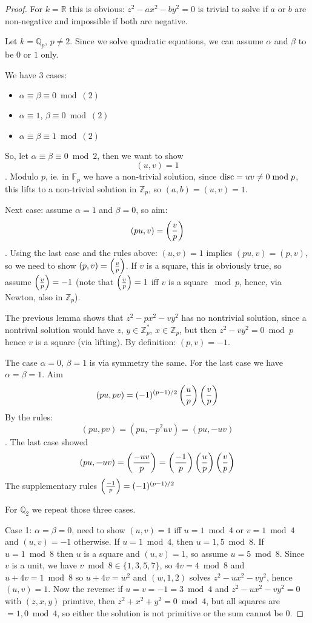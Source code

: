 \begin{proof}
  For $k=\mathbb R$ this is obvious: $z^2-ax^2-by^2 = 0$ is trivial to solve if
  $a$ or $b$ are non-negative and impossible if both are
  negative.


  Let $k=\mathbb Q_p$, $p\ne 2$. Since we solve quadratic equations, 
  we can assume $\alpha$ and $\beta$ to be $0$ or $1$ only.

  We have 3 cases:
  \begin{itemize}
    \item $\alpha \equiv \beta \equiv 0 \bmod (2)$
    \item $\alpha \equiv 1$, $\beta \equiv 0 \bmod (2)$
    \item $\alpha \equiv \beta \equiv 1 \bmod (2)$
  \end{itemize}

  So, let $\alpha \equiv \beta \equiv 0 \bmod 2$, then we want to show
  $$(u,v) = 1$$. Modulo $p$, ie. in $\mathbb F_p$ we have a non-trivial solution,
  since $\mathop{\rm disc}\nolimits = uv\ne 0\bmod p$, this lifts to a non-trivial solution
  in $\mathbb Z_p$, so $(a,b) = (u,v) = 1$.

  Next case: assume $\alpha=1$ and $\beta = 0$, so aim:
  $$(pu, v) = \left(\frac{v}{p}\right)$$. Using the last case and the rules above:
  $(u,v) = 1 $ implies $(pu, v) = (p, v)$, so we need to show
  $(p, v) = \left(\frac{v}{p}\right)$. If $v$ is a square, this is obviously true, so
  assume $\left(\frac{v}{p}\right) = -1$ (note that $\left(\frac{v}{p}\right) = 1$ iff $v$ is a square
  $\bmod p$, hence, via Newton, also in $\mathbb Z_p$).

  The previous lemma shows that $z^2-px^2-vy^2$ has no nontrivial solution, since
  a nontrival solution would have $z$, $y\in \mathbb Z_p^*$, $x\in \mathbb Z_p$,
  but then $z^2-vy^2=0\bmod p$ hence $v$ is a square (via lifting). By 
  definition: $(p, v) = -1$.

  The case $\alpha = 0$, $\beta = 1$ is via symmetry the same.
  For the last case we have $\alpha = \beta = 1$. Aim
  $$(pu, pv) = (-1)^{(p-1)/2}\left(\frac{u}{p}\right) \left(\frac{v}{p}\right)$$
  By the rules: 
  $$(pu, pv) = (pu, -p^2uv) = (pu, -uv)$$.
  The last case showed
  $$(pu, -uv) = \left(\frac{-uv}{p}\right) = \left(\frac{-1}{p}\right) \left(\frac{u}{p}\right) \left(\frac{v}{p}\right)$$
  The supplementary rules $\left(\frac{-1}{p}\right) =(-1)^{(p-1)/2}$

  For $\mathbb Q_2$ we repeat those three cases.

  Case 1: $\alpha = \beta =0$, need to show $(u,v) = 1$ iff $u=1\bmod 4$
  or $v=1\bmod 4$ and $(u,v) = -1$ otherwise. If $u=1\bmod 4$, then
  $u=1,5 \bmod 8$. If $u=1\bmod 8$ then $u$ is a square and $(u,v) = 1$, so
  assume $u=5\bmod 8$. Since $v$ is a unit, we have $v\bmod 8 \in \{1, 3, 5, 7\}$, so $4v = 4\bmod 8$ and $u+4v=1\bmod 8$ so $u+4v = w^2$ and
  $(w, 1, 2)$ solves $z^2-ux^2-vy^2$, hence $(u,v) = 1$.
  Now the reverse: if $u=v=-1=3\bmod 4$ and $z^2-ux^2-vy^2=0$
  with $(z, x, y)$ primtive, then $z^2+x^2+y^2 = 0 \bmod 4$, but
  all squares are $=1, 0\bmod 4$, so either the solution is not primitive
  or the sum cannot be $0$.


\end{proof}
